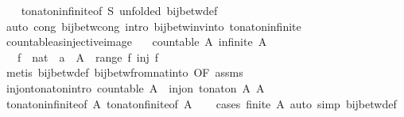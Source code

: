 \begin{isabellebody}
\ \ \isamarkupfalse%
\ to{\isacharunderscore}nat{\isacharunderscore}on{\isacharunderscore}infinite{\isacharbrackleft}of\ S{\isacharcomma}\ unfolded\ bij{\isacharunderscore}betw{\isacharunderscore}def{\isacharbrackright}\isanewline
\ \ \isamarkupfalse%
\ {\isacharparenleft}auto\ cong{\isacharcolon}\ bij{\isacharunderscore}betw{\isacharunderscore}cong\ intro{\isacharcolon}\ bij{\isacharunderscore}betw{\isacharunderscore}inv{\isacharunderscore}into\ to{\isacharunderscore}nat{\isacharunderscore}on{\isacharunderscore}infinite{\isacharparenright}%
\endisatagproof
{\isafoldproof}%
%
\isadelimproof
\isanewline
%
\endisadelimproof
\isanewline
{}\isamarkupfalse%
\ countable{\isacharunderscore}as{\isacharunderscore}injective{\isacharunderscore}image{\isacharcolon}\isanewline
\ \ \ {\isachardoublequoteopen}countable\ A{\isachardoublequoteclose}\ {\isachardoublequoteopen}infinite\ A{\isachardoublequoteclose}\isanewline
\ \ \ f\ {\isacharcolon}{\isacharcolon}\ {\isachardoublequoteopen}nat\ {\isasymRightarrow}\ {\isacharprime}a{\isachardoublequoteclose}\ \ {\isachardoublequoteopen}A\ {\isacharequal}\ range\ f{\isachardoublequoteclose}\ {\isachardoublequoteopen}inj\ f{\isachardoublequoteclose}\isanewline
%
\isadelimproof
%
\endisadelimproof
%
\isatagproof
{}\isamarkupfalse%
\ {\isacharparenleft}metis\ bij{\isacharunderscore}betw{\isacharunderscore}def\ bij{\isacharunderscore}betw{\isacharunderscore}from{\isacharunderscore}nat{\isacharunderscore}into\ {\isacharbrackleft}OF\ assms{\isacharbrackright}{\isacharparenright}%
\endisatagproof
{\isafoldproof}%
%
\isadelimproof
\isanewline
%
\endisadelimproof
\isanewline
{}\isamarkupfalse%
\ inj{\isacharunderscore}on{\isacharunderscore}to{\isacharunderscore}nat{\isacharunderscore}on{\isacharbrackleft}intro{\isacharbrackright}{\isacharcolon}\ {\isachardoublequoteopen}countable\ A\ {\isasymLongrightarrow}\ inj{\isacharunderscore}on\ {\isacharparenleft}to{\isacharunderscore}nat{\isacharunderscore}on\ A{\isacharparenright}\ A{\isachardoublequoteclose}\isanewline
%
\isadelimproof
\ \ %
\endisadelimproof
%
\isatagproof
{}\isamarkupfalse%
\ to{\isacharunderscore}nat{\isacharunderscore}on{\isacharunderscore}infinite{\isacharbrackleft}of\ A{\isacharbrackright}\ to{\isacharunderscore}nat{\isacharunderscore}on{\isacharunderscore}finite{\isacharbrackleft}of\ A{\isacharbrackright}\isanewline
\ \ \isamarkupfalse%
\ {\isacharparenleft}cases\ {\isachardoublequoteopen}finite\ A{\isachardoublequoteclose}{\isacharparenright}\ {\isacharparenleft}auto\ simp{\isacharcolon}\ bij{\isacharunderscore}betw{\isacharunderscore}def{\isacharparenright}%

\end{isabellebody}
